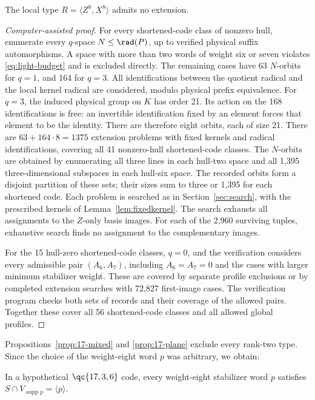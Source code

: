 \begin{proposition}\label{prop:17-plane}
The local type \(R=\langle Z^8,X^8\rangle\) admits no extension.
\end{proposition}
\begin{proof}[Computer-assisted proof]
For every shortened-code class of nonzero hull, enumerate every
\(q\)-space \(N\leq\rad(P)\), up to verified physical suffix automorphisms.
A space with more than two words of weight six or seven violates
\eqref{eq:light-budget} and is excluded directly. The remaining cases
have 63 \(N\)-orbits for \(q=1\), and 164 for \(q=3\).
All identifications between the quotient radical and the local kernel
radical are considered, modulo physical prefix equivalence. For \(q=3\),
the induced physical group on \(K\) has order 21. Its action on
the 168 identifications is free: an invertible identification fixed by
an element forces that element to be the identity. There are therefore
eight orbits, each of size 21. There are \(63+164\cdot8=1375\) extension problems with fixed
kernels and radical identifications, covering all 41 nonzero-hull
shortened-code classes. The \(N\)-orbits are obtained by enumerating all three lines
in each hull-two space and all 1,395 three-dimensional subspaces in each
hull-six space. The recorded orbits form a disjoint partition of these
sets; their sizes sum to three or 1,395 for each shortened code.
Each problem is searched as in Section~\ref{sec:search}, with the
prescribed kernels of Lemma~\ref{lem:fixedkernel}.
The search exhausts all assignments to the \(Z\)-only basis images.
For each of the 2,960 surviving tuples, exhaustive search finds no
assignment to the complementary images.

For the 15 hull-zero shortened-code classes, \(q=0\), and the
verification considers every admissible pair \((A_6,A_7)\), including
\(A_6=A_7=0\) and the cases with larger minimum stabilizer weight. These
are covered by separate profile exclusions or by completed extension
searches with 72,827 first-image cases. The verification program checks
both sets of records and their coverage of the allowed pairs. Together
these cover all 56 shortened-code classes and all allowed global profiles.
\end{proof}

Propositions~\ref{prop:17-mixed} and \ref{prop:17-plane} exclude every
rank-two type. Since the choice of the weight-eight word \(p\) was
arbitrary, we obtain:

\begin{corollary}\label{cor:rank-one-everywhere}
In a hypothetical \(\qc{17,3,6}\) code, every weight-eight stabilizer
word \(p\) satisfies \(S\cap V_{\operatorname{supp}p}=\langle p\rangle\).
\end{corollary}
